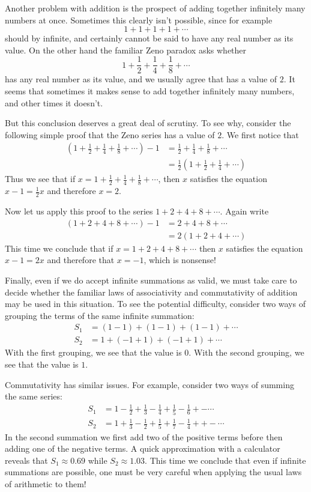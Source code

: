 \documentclass[11pt,oneside]{amsbook}
\theoremstyle{definition}
\theoremstyle{plain}
\theoremstyle{definition}
\theoremstyle{remark}
\numberwithin{equation}{section}
\numberwithin{figure}{section}
\begin{document}
Another problem with addition is the prospect of adding together infinitely many numbers at once. Sometimes this clearly isn't possible, since for example 
\[1+1+1+1+\cdots
\]
should by infinite, and certainly cannot be said to have any real number as its value. On the other hand the familiar Zeno paradox asks whether
\[1+\frac12+\frac14+\frac18+\cdots
\]
has any real number as its value, and we usually agree that has a value of $2$. It seems that sometimes it makes sense to add together infinitely many numbers, and other times it doesn't.

But this conclusion deserves a great deal of scrutiny. To see why, consider the following simple proof that the Zeno series has a value of $2$. We first notice that
\begin{align*}
(1+\frac12+\frac14+\frac18+\cdots)-1&=\frac12+\frac14+\frac18+\cdots\\
                                    &=\frac12(1+\frac12+\frac14+\cdots)
\end{align*}
Thus we see that if $x=1+\frac12+\frac14+\frac18+\cdots$, then $x$ satisfies the equation $x-1=\frac12x$ and therefore $x=2$.

Now let us apply this proof to the series $1+2+4+8+\cdots$. Again write
\begin{align*}
(1+2+4+8+\cdots)-1&=2+4+8+\cdots\\
                  &=2(1+2+4+\cdots)
\end{align*}
This time we conclude that if $x=1+2+4+8+\cdots$ then $x$ satisfies the equation $x-1=2x$ and therefore that $x=-1$, which is nonsense!

Finally, even if we do accept infinite summations as valid, we must take care to decide whether the familiar laws of associativity and commutativity of addition may be used in this situation. To see the potential difficulty, consider two ways of grouping the terms of the same infinite summation:
\begin{align*}
S_1&=(1-1)+(1-1)+(1-1)+\cdots\\
S_2&=1+(-1+1)+(-1+1)+\cdots
\end{align*}
With the first grouping, we see that the value is $0$. With the second grouping, we see that the value is $1$.

Commutativity has similar issues. For example, consider two ways of summing the same series:
\begin{align*}
S_1&=1-\frac12+\frac13-\frac14+\frac15-\frac16+-\cdots\\
S_2&=1+\frac13-\frac12+\frac15+\frac17-\frac14++-\cdots
\end{align*}
In the second summation we first add two of the positive terms before then adding one of the negative terms. A quick approximation with a calculator reveals that $S_1\approx0.69$ while $S_2\approx1.03$. This time we conclude that even if infinite summations are possible, one must be very careful when applying the usual laws of arithmetic to them!
\end{document}
